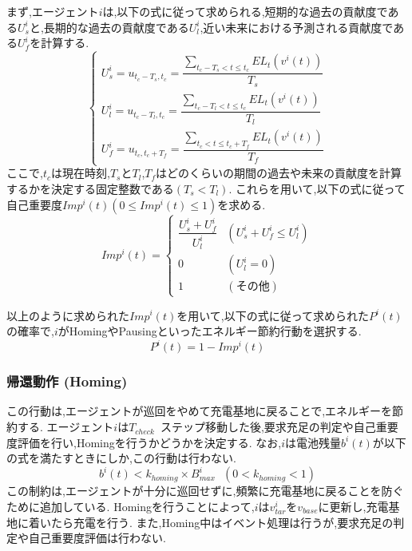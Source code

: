 \documentclass[12pt,a4j,twoside]{jarticle}
\begin{document}
  \par
  まず,エージェント$i$は,以下の式に従って求められる,短期的な過去の貢献度である$U^i_s$と,長期的な過去の貢献度である$U^i_l$,近い未来における予測される貢献度である$U^i_f$を計算する.
  \begin{equation}
    \begin{cases}
      U^i_s = u_{t_c-T_s, t_c} = \dfrac{\displaystyle \sum_{t_c-T_s < t \leq t_c} EL_t(v^i(t))}{T_s} \\
      U^i_l = u_{t_c-T_l, t_c} = \dfrac{\displaystyle \sum_{t_c-T_l < t \leq t_c} EL_t(v^i(t))}{T_l} \\
      U^i_f = u_{t_c, t_c+T_f} = \dfrac{\displaystyle \sum_{t_c < t \leq t_c+T_f} EL_t(v^i(t))}{T_f}
    \end{cases}
  \end{equation}
  ここで,$t_c$は現在時刻,$T_s$と$T_l$,$T_f$はどのくらいの期間の過去や未来の貢献度を計算するかを決定する固定整数である$(T_s < T_l)$.
  これらを用いて,以下の式に従って自己重要度$Imp^i(t) (0 \leq Imp^i(t) \leq 1)$を求める.
  \begin{equation}
    Imp^i(t) = 
    \begin{cases}
      \dfrac{U^i_s + U^i_f}{U^i_l} & (U^i_s + U^i_f \leq U^i_l) \\
      0                            & (U^i_l = 0) \\
      1                            & (その他)
    \end{cases}
  \end{equation}

  \par
  以上のように求められた$Imp^i(t)$を用いて,以下の式に従って求められた$P^i(t)$の確率で,$i$がHomingやPausingといったエネルギー節約行動を選択する.
  \begin{equation}
    P^i(t) = 1 - Imp^i(t)
  \end{equation}

  \subsubsection{帰還動作 (Homing)}
  この行動は,エージェントが巡回をやめて充電基地に戻ることで,エネルギーを節約する.
  エージェント$i$は$T_{check}$~ステップ移動した後,要求充足の判定や自己重要度評価を行い,Homingを行うかどうかを決定する.
  なお,$i$は電池残量$b^i(t)$が以下の式を満たすときにしか,この行動は行わない.
  \begin{equation}
    b^i(t) < k_{homing} \times B^i_{max} ~~~ (0 < k_{homing} < 1)
  \end{equation}
  この制約は,エージェントが十分に巡回せずに,頻繁に充電基地に戻ることを防ぐために追加している.
  Homingを行うことによって,$i$は$v^i_{tar}$を$v_{base}$に更新し,充電基地に着いたら充電を行う.
  また,Homing中はイベント処理は行うが,要求充足の判定や自己重要度評価は行わない.
\end{document}
